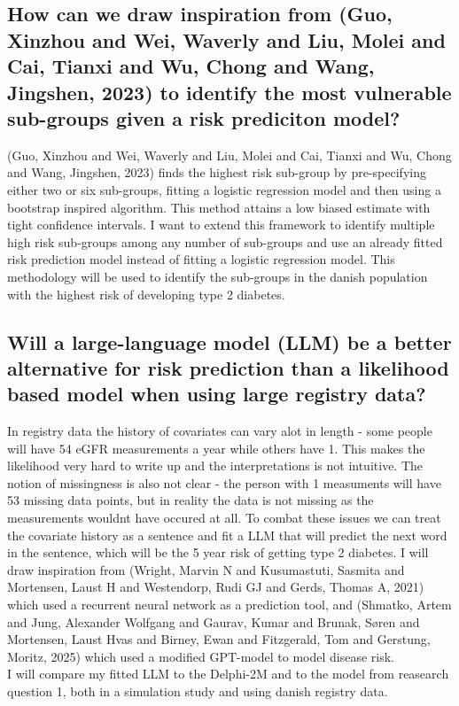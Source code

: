 \documentclass[11pt]{article}
\begin{document}
\subsection{How can we draw inspiration from (Guo, Xinzhou and Wei, Waverly and Liu, Molei and Cai, Tianxi and Wu, Chong and Wang, Jingshen, 2023) to identify the most vulnerable sub-groups given a risk prediciton model?}
\label{sec:org2019aa2}
(Guo, Xinzhou and Wei, Waverly and Liu, Molei and Cai, Tianxi and Wu, Chong and Wang, Jingshen, 2023) finds the highest risk sub-group by pre-specifying either two or six sub-groups, fitting a logistic regression model and then using a bootstrap inspired algorithm. This method attains a low biased estimate with tight confidence intervals. I want to extend this framework to identify multiple high risk sub-groups among any number of sub-groups and use an already fitted risk prediction model instead of fitting a logistic regression model. This methodology will be used to identify the sub-groups in the danish population with the highest risk of developing type 2 diabetes.

\subsection{Will a large-language model (LLM) be a better alternative for risk prediction than a likelihood based model when using large registry data?}
\label{sec:org532c21f}
In registry data the history of covariates can vary alot in length - some people will have 54 eGFR measurements a year while others have 1. This makes the likelihood very hard to write up and the interpretations is not intuitive. The notion of missingness is also not clear - the person with 1 measuments will have 53 missing data points, but in reality the data is not missing as the measurements wouldnt have occured at all. To combat these issues we can treat the covariate history as a sentence and fit a LLM that will predict the next word in the sentence, which will be the 5 year risk of getting type 2 diabetes. I will draw inspiration from (Wright, Marvin N and Kusumastuti, Sasmita and Mortensen, Laust H and Westendorp, Rudi GJ and Gerds, Thomas A, 2021) which used a recurrent neural network as a prediction tool, and (Shmatko, Artem and Jung, Alexander Wolfgang and Gaurav, Kumar and Brunak, S{\o}ren and Mortensen, Laust Hvas and Birney, Ewan and Fitzgerald, Tom and Gerstung, Moritz, 2025) which used a modified GPT-model to model disease risk.\\[0pt]
I will compare my fitted LLM to the Delphi-2M and to the model from reasearch question 1, both in a simulation study and using danish registry data.
\end{document}
